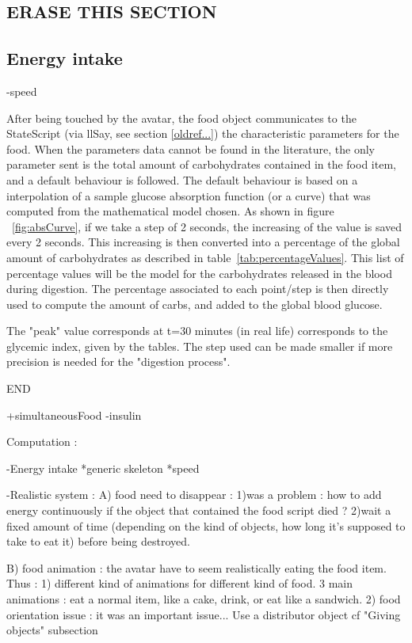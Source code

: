     
\subsection{ERASE THIS SECTION}



\subsection{Energy intake}
-speed

After being touched by the avatar, the food object communicates to the StateScript (via llSay, see section \ref{oldref...}) the characteristic parameters for the food. When the parameters data cannot be found in the literature, the only parameter sent is the total amount of carbohydrates contained in the food item, and a default behaviour is followed. The default behaviour is based on a interpolation of a sample glucose absorption function (or a curve) that was computed from the mathematical model chosen. As shown in figure ~\ref{fig:absCurve}, if we take a step of 2 seconds, the increasing of the value is saved every 2 seconds. This increasing is then converted into a percentage of the global amount of carbohydrates as described in table~\ref{tab:percentageValues}. This list of percentage values will be the model for the carbohydrates released in the blood during digestion. 
The percentage associated to each point/step is then directly used to compute the amount of carbs, and added to the global blood glucose. 

The "peak" value corresponds at t=30 minutes (in real life) corresponds to the glycemic index, given by the tables. 
The step used can be made smaller if more precision is needed for the "digestion process".

END

\iffalse

+simultaneousFood
-insulin


Computation : 
 
-Energy intake
    *generic skeleton
    *speed
    
-Realistic system :
    A) food need to disappear : 
        1)was a problem : how to add energy continuously if the object that contained the food script died ? 
        2)wait a fixed amount of time (depending on the kind of objects, how long it's supposed to take to eat it) before being destroyed.
        
    B) food animation : the avatar have to seem realistically eating the food item. Thus :
        1) different kind of animations for different kind of food. 3 main animations : eat a normal item, like a cake, drink, or eat like a sandwich.
        2) food orientation issue : it was an important issue... Use a distributor object cf "Giving objects" subsection
    

